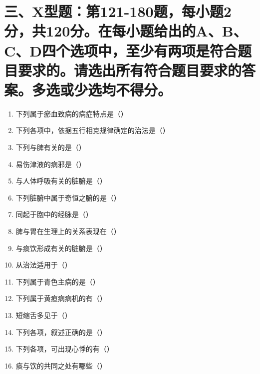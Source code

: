 \documentclass[a4paper,11pt]{ctexart}
\begin{document}
\section*{\large 三、X型题：第121-180题，每小题2分，共120分。在每小题给出的A、B、C、D四个选项中，至少有两项是符合题目要求的。请选出所有符合题目要求的答案。多选或少选均不得分。}

\begin{enumerate}[resume]
      \item 下列属于瘀血致病的病症特点是（\quad）
      \item 下列各项中，依据五行相克规律确定的治法是（\quad）
      \item 下列与脾有关的是（\quad）
      \item 易伤津液的病邪是（\quad）
      \item 与人体呼吸有关的脏腑是（\quad）
      \item 下列脏腑中属于奇恒之腑的是（\quad）
      \item 同起于胞中的经脉是（\quad）
      \item 脾与胃在生理上的关系表现在（\quad）
      \item 与痰饮形成有关的脏腑是（\quad）
      \item 从治法适用于（\quad）
      \item 下列属于青色主病的是（\quad）
      \item 下列属于黄疸病病机的有（\quad）
      \item 短缩舌多见于（\quad）
      \item 下列各项，叙述正确的是（\quad）
      \item 下列各项，可出现心悸的有（\quad）
      \item 痰与饮的共同之处有哪些（\quad）

\end{enumerate}
\end{document}
